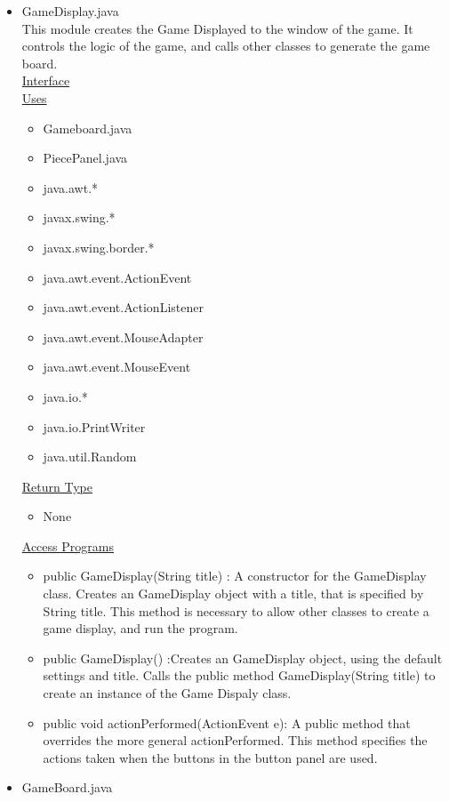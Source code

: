 \documentclass[12pt]{article}
\begin{document}
	\begin{itemize}
		\item GameDisplay.java \\
		This module creates the Game Displayed to the window of the game. It controls the logic of the game, and calls other classes to generate the game board. \\
		\underline{Interface} \\
		\underline{Uses}
		\begin{itemize}
			\item Gameboard.java
			\item PiecePanel.java
			\item java.awt.*
			\item javax.swing.*
			\item javax.swing.border.*
			\item java.awt.event.ActionEvent
			\item java.awt.event.ActionListener
			\item java.awt.event.MouseAdapter
			\item java.awt.event.MouseEvent
			\item java.io.*
			\item java.io.PrintWriter
			\item java.util.Random
		\end{itemize} 
		\underline{Return Type}
		\begin{itemize}
			\item None
		\end{itemize}
		\underline{Access Programs}
		\begin{itemize}
			\item public GameDisplay(String title) : A constructor for the GameDisplay class. Creates an GameDisplay object with a title, that is specified by String title. This method is necessary to allow other classes to create a game display, and run the program.
			\item public GameDisplay() :Creates an GameDisplay object, using the default settings and title. Calls the public method GameDisplay(String title) to create an instance of the Game Dispaly class.
			\item public void actionPerformed(ActionEvent e): A public method that overrides the more general actionPerformed. This method specifies the actions taken when the buttons in the button panel are used.
		\end{itemize}
		\item GameBoard.java \\

\end{itemize}
\end{document}
